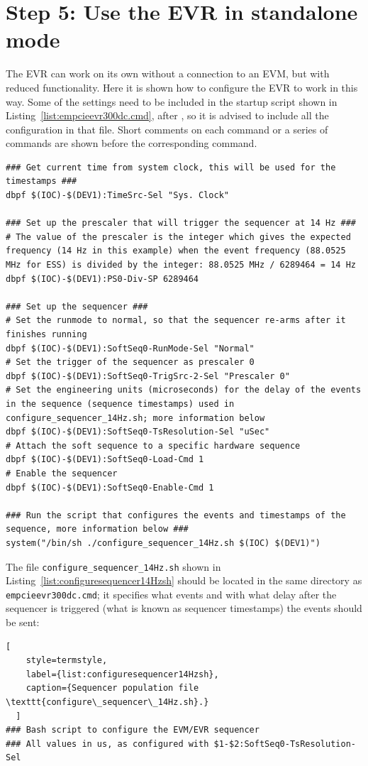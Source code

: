 \documentclass[11pt
  , a4paper
  , article
  , oneside
  , showtrims
]{memoir}
\begin{document}
{\section{Step 5: Use the EVR in standalone mode}
The EVR can work on its own without a connection to an EVM, but with reduced functionality. Here it is shown how to configure the EVR to work in this way. Some of the settings need to be included in the startup script shown in Listing~\ref{list:empcieevr300dc.cmd}, after , so it is advised to include all the configuration in that file. Short comments on each command or a series of commands are shown before the corresponding command.
\begin{lstlisting}[style=termstyle]
### Get current time from system clock, this will be used for the timestamps ###
dbpf $(IOC)-$(DEV1):TimeSrc-Sel "Sys. Clock"

### Set up the prescaler that will trigger the sequencer at 14 Hz ###
# The value of the prescaler is the integer which gives the expected frequency (14 Hz in this example) when the event frequency (88.0525 MHz for ESS) is divided by the integer: 88.0525 MHz / 6289464 = 14 Hz
dbpf $(IOC)-$(DEV1):PS0-Div-SP 6289464

### Set up the sequencer ###
# Set the runmode to normal, so that the sequencer re-arms after it finishes running
dbpf $(IOC)-$(DEV1):SoftSeq0-RunMode-Sel "Normal"
# Set the trigger of the sequencer as prescaler 0
dbpf $(IOC)-$(DEV1):SoftSeq0-TrigSrc-2-Sel "Prescaler 0"
# Set the engineering units (microseconds) for the delay of the events in the sequence (sequence timestamps) used in configure_sequencer_14Hz.sh; more information below
dbpf $(IOC)-$(DEV1):SoftSeq0-TsResolution-Sel "uSec"
# Attach the soft sequence to a specific hardware sequence
dbpf $(IOC)-$(DEV1):SoftSeq0-Load-Cmd 1
# Enable the sequencer
dbpf $(IOC)-$(DEV1):SoftSeq0-Enable-Cmd 1

### Run the script that configures the events and timestamps of the sequence, more information below ###
system("/bin/sh ./configure_sequencer_14Hz.sh $(IOC) $(DEV1)")
\end{lstlisting}

The file \texttt{configure\_sequencer\_14Hz.sh} shown in Listing~\ref{list:configuresequencer14Hzsh} should be located in the same directory as \texttt{empcieevr300dc.cmd}; it specifies what events and with what delay after the sequencer is triggered (what is known as sequencer timestamps) the events should be sent:
\begin{lstlisting}[
    style=termstyle,
    label={list:configuresequencer14Hzsh},
    caption={Sequencer population file \texttt{configure\_sequencer\_14Hz.sh}.}
  ]
### Bash script to configure the EVM/EVR sequencer
### All values in us, as configured with $1-$2:SoftSeq0-TsResolution-Sel


\end{lstlisting}}
\end{document}
